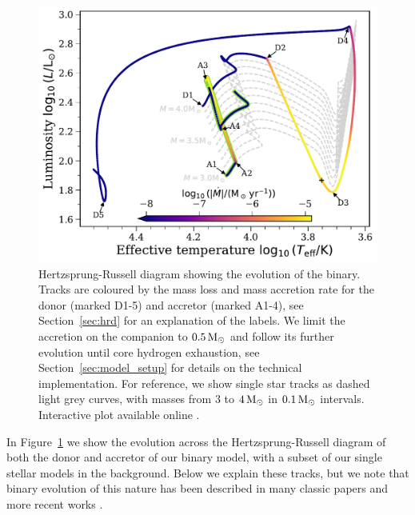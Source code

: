 \documentclass[desactivate]{aa}
\begin{document}
\begin{figure}
    \centering
    \includegraphics[width=\columnwidth]{paper/figures/HRD_binary_compromise.pdf}
    \caption{Hertzsprung-Russell diagram showing the evolution of the binary. Tracks are coloured by the mass loss and mass accretion rate for the donor (marked D1-5) and accretor (marked A1-4), see Section~\ref{sec:hrd} for an explanation of the labels. We limit the accretion on the companion to $0.5 \, {\rm M_\odot}$ and follow its further evolution until core hydrogen exhaustion, see Section~\ref{sec:model_setup} for details on the technical implementation. For reference, we show single star tracks as dashed light grey curves, with masses from $3$ to $4 \, {\rm M_\odot}$ in $0.1 \, {\rm M_\odot}$ intervals.\\Interactive plot available online \href{www.tomwagg.com/html/interact/mass-gainer-asteroseismology.html\#fig1}{\faChartArea}.}
    \label{fig:hrd}
\end{figure}

In Figure~\ref{fig:hrd} we show the evolution across the Hertzsprung-Russell diagram of both the donor and accretor of our binary model, with a subset of our single stellar models in the background. Below we explain these tracks, but we note that binary evolution of this nature has been described in many classic papers \citep[e.g.][]{Morton+1960:1960ApJ...132..146M, Smak+1962:1962AcA....12...28S, Paczynski+1966:1966AcA....16..231P,Kippenhahn+1969:1969A&A.....3...83K,Yungelson+1973:1973NInfo..27...93Y,vanderLinden+1987:1987A&A...178..170V} and more recent works \citep[e.g.][]{Yoon+2010:2010ApJ...725..940Y,Claeys+2011:2011A&A...528A.131C, Eldridge+2013:2013MNRAS.436..774E, Tauris+2015:2015MNRAS.451.2123T, McClelland+2016:2016MNRAS.459.1505M, Yoon+2017:2017ApJ...840...10Y, Gotberg+2017:2017A&A...608A..11G, Renzo+2021}.
\end{document}
